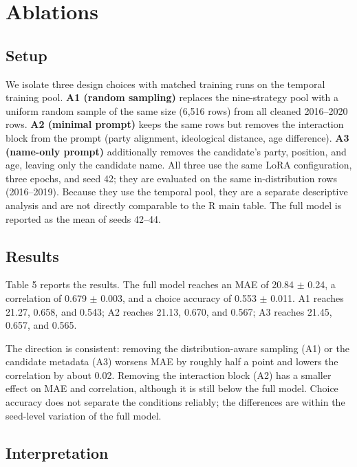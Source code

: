 \section{Ablations}\label{ablations}

\subsection{Setup}\label{setup-3}

We isolate three design choices with matched training runs on the
temporal training pool. \textbf{A1 (random sampling)} replaces the
nine-strategy pool with a uniform random sample of the same size (6,516
rows) from all cleaned 2016--2020 rows. \textbf{A2 (minimal prompt)}
keeps the same rows but removes the interaction block from the prompt
(party alignment, ideological distance, age difference). \textbf{A3
(name-only prompt)} additionally removes the candidate's party,
position, and age, leaving only the candidate name. All three use the
same LoRA configuration, three epochs, and seed 42; they are evaluated
on the same in-distribution rows (2016--2019). Because they use the
temporal pool, they are a separate descriptive analysis and are not
directly comparable to the R main table. The full model is reported as
the mean of seeds 42--44.

\subsection{Results}\label{results}

Table 5 reports the results. The full model reaches an MAE of 20.84
\(\pm\) 0.24, a correlation of 0.679 \(\pm\) 0.003, and a choice
accuracy of 0.553 \(\pm\) 0.011. A1 reaches 21.27, 0.658, and 0.543; A2
reaches 21.13, 0.670, and 0.567; A3 reaches 21.45, 0.657, and 0.565.

The direction is consistent: removing the distribution-aware sampling
(A1) or the candidate metadata (A3) worsens MAE by roughly half a point
and lowers the correlation by about 0.02. Removing the interaction block
(A2) has a smaller effect on MAE and correlation, although it is still
below the full model. Choice accuracy does not separate the conditions
reliably; the differences are within the seed-level variation of the
full model.

\subsection{Interpretation}\label{interpretation-1}

